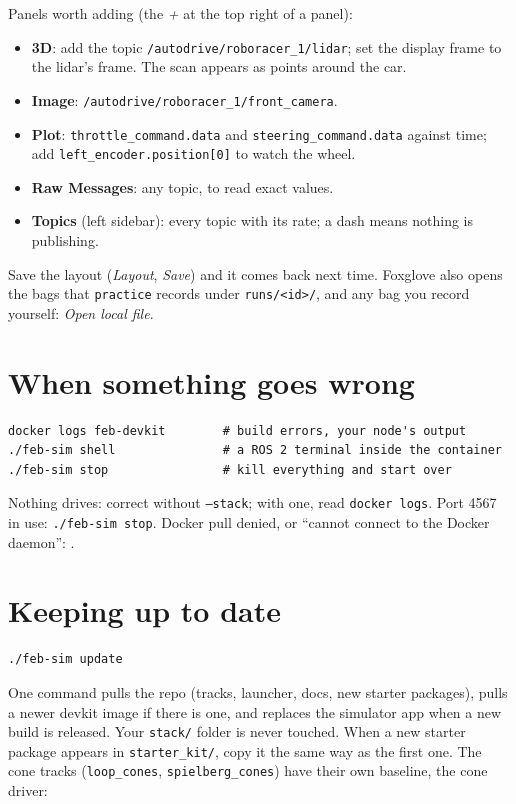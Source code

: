 Panels worth adding (the \emph{+} at the top right of a panel):
\begin{itemize}
  \item \textbf{3D}: add the topic \texttt{/autodrive/roboracer\_1/lidar}; set the display frame to the lidar's frame. The scan appears as points around the car.
  \item \textbf{Image}: \texttt{/autodrive/roboracer\_1/front\_camera}.
  \item \textbf{Plot}: \texttt{throttle\_command.data} and \texttt{steering\_command.data} against time; add \texttt{left\_encoder.position[0]} to watch the wheel.
  \item \textbf{Raw Messages}: any topic, to read exact values.
  \item \textbf{Topics} (left sidebar): every topic with its rate; a dash means nothing is publishing.
\end{itemize}

Save the layout (\emph{Layout}, \emph{Save}) and it comes back next time. Foxglove also opens the
bags that \texttt{practice} records under \texttt{runs/<id>/}, and any bag you record yourself:
\emph{Open local file}.

\section{When something goes wrong}

\begin{lstlisting}
docker logs feb-devkit        # build errors, your node's output
./feb-sim shell               # a ROS 2 terminal inside the container
./feb-sim stop                # kill everything and start over
\end{lstlisting}

Nothing drives: correct without \texttt{--stack}; with one, read \texttt{docker logs}.
Port 4567 in use: \texttt{./feb-sim stop}. Docker pull denied, or ``cannot connect to the Docker daemon'': \OSdockerfix.

\section{Keeping up to date}

\begin{lstlisting}
./feb-sim update
\end{lstlisting}

One command pulls the repo (tracks, launcher, docs, new starter packages), pulls a newer devkit
image if there is one, and replaces the simulator app when a new build is released. Your
\texttt{stack/} folder is never touched. When a new starter package appears in
\texttt{starter\_kit/}, copy it the same way as the first one. The cone tracks
(\texttt{loop\_cones}, \texttt{spielberg\_cones}) have their own baseline, the cone driver:

